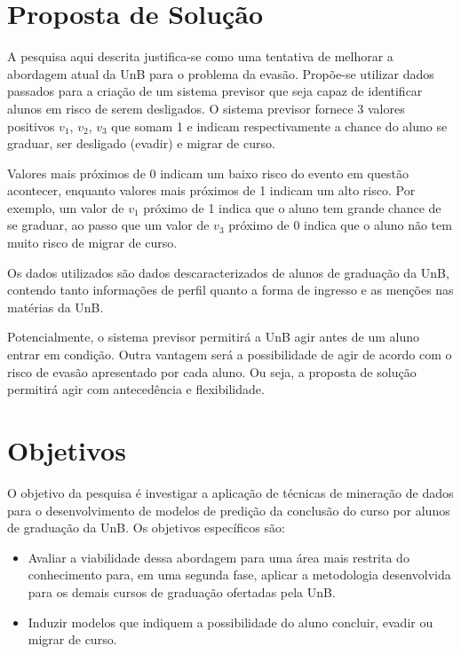 \section{Proposta de Solução}
    A pesquisa aqui descrita justifica-se como uma tentativa de melhorar a abordagem
    atual da UnB para o problema da evasão. Propõe-se utilizar dados passados para
    a criação de um sistema previsor que seja capaz de identificar alunos em risco de
    serem desligados. O sistema previsor fornece 3 valores positivos $v_1$, $v_2$,
    $v_3$ que somam 1 e indicam respectivamente a chance do aluno se graduar, ser
    desligado (evadir) e migrar de curso. 
    \par Valores mais próximos de 0 indicam um baixo risco do evento em
    questão acontecer, enquanto valores mais próximos de 1 indicam um alto risco. Por
    exemplo, um valor de $v_1$ próximo de 1 indica que o aluno tem grande chance de se
    graduar, ao passo que um valor de $v_3$ próximo de 0 indica que o aluno não tem 
    muito risco de migrar de curso. 
    \par Os dados utilizados são dados descaracterizados de alunos de
    graduação da UnB, contendo tanto informações de perfil quanto a forma de ingresso e
    as menções nas matérias da UnB. 
    \par Potencialmente, o sistema previsor permitirá a
    UnB agir antes de um aluno entrar em condição. Outra vantagem será a possibilidade
    de agir de acordo com o risco de evasão apresentado por cada
    aluno. Ou seja, a proposta de solução permitirá agir com antecedência e
    flexibilidade. 

\section{Objetivos}
O objetivo da pesquisa é investigar a aplicação de técnicas de mineração de dados
para o desenvolvimento de modelos de predição da conclusão do curso por alunos de
graduação da UnB. Os objetivos específicos são: 
\begin{itemize}
    \item Avaliar a viabilidade dessa abordagem para
          uma área mais restrita do conhecimento para, em uma segunda fase, aplicar a
          metodologia desenvolvida para os demais cursos de graduação ofertadas pela UnB.
    \item Induzir modelos que indiquem a possibilidade do aluno concluir, evadir ou
          migrar de curso. 
\end{itemize}  

